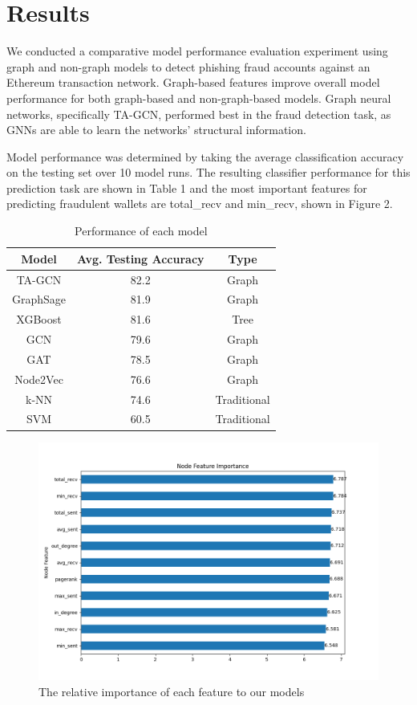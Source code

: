 \documentclass{article}
\begin{document}
\section{Results}
    We conducted a comparative model performance evaluation experiment using graph and non-graph models to detect phishing fraud accounts against an Ethereum transaction network. Graph-based features improve overall model performance for both graph-based and non-graph-based models. Graph neural networks, specifically TA-GCN, performed best in the fraud detection task, as GNNs are able to learn the networks’ structural information. 

    Model performance was determined by taking the average classification accuracy on the testing set over 10 model runs. The resulting classifier performance for this prediction task are shown in Table 1 and the most important features for predicting fraudulent wallets are total\_recv and min\_recv, shown in Figure 2.
    
\begin{table}[h]
\centering
\begin{tabular}{ |c|c|c| } 
	\hline
	Model & Avg. Testing Accuracy & Type \\
	\hline \hline
	TA-GCN & 82.2 & Graph \\ 
	\hline
    GraphSage & 81.9 & Graph \\ 
	\hline
	XGBoost & 81.6 & Tree \\ 
	\hline
	GCN & 79.6 & Graph \\ 
	\hline
	GAT & 78.5 & Graph \\ 
	\hline
	Node2Vec & 76.6 & Graph \\ 
	\hline
	k-NN & 74.6 & Traditional \\ 
	\hline
	SVM & 60.5 & Traditional \\ 
	\hline
\end{tabular}
\caption{Performance of each model}
\end{table}

\begin{figure}[h]
	\centering
	\includegraphics[width=0.8\linewidth]{images/tagcn_feat_imp.png}
	\caption{The relative importance of each feature to our models}
\end{figure}
    
\end{document}
